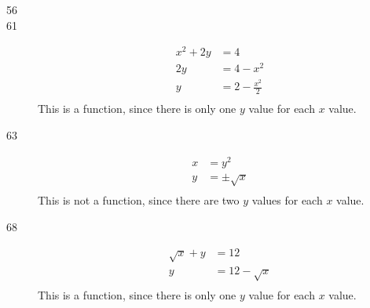 \documentclass{exam}
\begin{document}
\begin{description}

    \item[56]

    \item[61]
      \begin{align*}
        x^2 + 2y &= 4 \\
        2y &= 4 - x^2 \\
        y &= 2 - \frac{x^2}{2} \\
      \end{align*}
      This is a function, since there is only one $y$ value for each $x$ value.

    \item[63]
      \begin{align*}
        x &= y^2 \\
        y &= \pm \sqrt{x} \\
      \end{align*}
      This is not a function, since there are two $y$ values for each $x$ value.

    \item[68]
      \begin{align*}
        \sqrt{x} + y &= 12 \\
        y &= 12 - \sqrt{x} \\
      \end{align*}
      This is a function, since there is only one $y$ value for each $x$ value.


\end{description}
\end{document}
